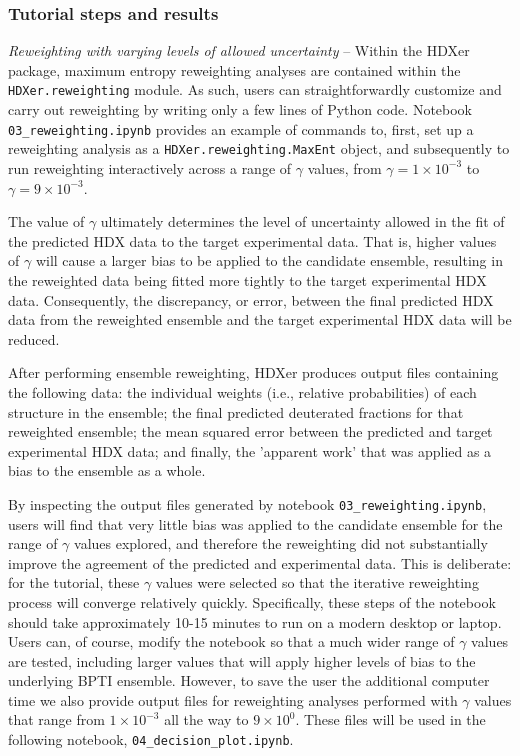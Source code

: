 \documentclass[9pt,tutorial]{livecoms}
\begin{document}
\subsubsection{Tutorial steps and results}

\noindent
\textit{Reweighting with varying levels of allowed uncertainty} -- Within the HDXer package, maximum entropy reweighting analyses are contained within the \texttt{HDXer.reweighting} module.
As such, users can straightforwardly customize and carry out reweighting by writing only a few lines of Python code.
Notebook \texttt{03\_reweighting.ipynb} provides an example of commands to, first, set up a reweighting analysis as a \texttt{HDXer.reweighting.MaxEnt} object, and subsequently to run reweighting interactively across a range of $\gamma$ values, from $\gamma = 1\times10^{-3}$ to $\gamma = 9\times10^{-3}$.

The value of $\gamma$ ultimately determines the level of uncertainty allowed in the fit of the predicted HDX data to the target experimental data. 
That is, higher values of $\gamma$ will cause a larger bias to be applied to the candidate ensemble, resulting in the reweighted data being fitted more tightly to the target experimental HDX data. 
Consequently, the discrepancy, or error, between the final predicted HDX data from the reweighted ensemble and the target experimental HDX data will be reduced.

After performing ensemble reweighting, HDXer produces output files containing the following data: the individual weights (i.e., relative probabilities) of each structure in the ensemble; the final predicted deuterated fractions for that reweighted ensemble; the mean squared error between the predicted and target experimental HDX data; and finally, the 'apparent work' that was applied as a bias to the ensemble as a whole.

By inspecting the output files generated by notebook \texttt{03\_reweighting.ipynb}, users will find that very little bias was applied to the candidate ensemble for the range of $\gamma$ values explored, and therefore the reweighting did not substantially improve the agreement of the predicted and experimental data.
This is deliberate: for the tutorial, these $\gamma$ values were selected so that the iterative reweighting process will converge relatively quickly. 
Specifically, these steps of the notebook should take approximately 10-15 minutes to run on a modern desktop or laptop.
Users can, of course, modify the notebook so that a much wider range of $\gamma$ values are tested, including larger values that will apply higher levels of bias to the underlying BPTI ensemble.
However, to save the user the additional computer time we also provide output files for reweighting analyses performed with $\gamma$ values that range from $1\times10^{-3}$ all the way to $9\times10^{0}$. 
These files will be used in the following notebook, \texttt{04\_decision\_plot.ipynb}.
\end{document}

